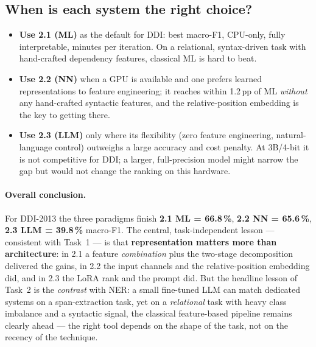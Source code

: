\documentclass[a4paper,11pt]{article}
\begin{document}
\subsection{When is each system the right choice?}
\begin{itemize}
\item \textbf{Use 2.1 (ML)} as the default for DDI: best macro-F1,
CPU-only, fully interpretable, minutes per iteration. On a relational,
syntax-driven task with hand-crafted dependency features, classical ML
is hard to beat.
\item \textbf{Use 2.2 (NN)} when a GPU is available and one prefers
learned representations to feature engineering; it reaches within 1.2\,pp
of ML \emph{without} any hand-crafted syntactic features, and the
relative-position embedding is the key to getting there.
\item \textbf{Use 2.3 (LLM)} only where its flexibility (zero feature
engineering, natural-language control) outweighs a large accuracy and
cost penalty. At 3B/4-bit it is not competitive for DDI; a larger,
full-precision model might narrow the gap but would not change the
ranking on this hardware.
\end{itemize}

\paragraph{Overall conclusion.}
For DDI-2013 the three paradigms finish \textbf{2.1 ML = 66.8\,\%},
\textbf{2.2 NN = 65.6\,\%}, \textbf{2.3 LLM = 39.8\,\%} macro-F1. The
central, task-independent lesson --- consistent with Task~1 --- is that
\textbf{representation matters more than architecture}: in 2.1 a feature
\emph{combination} plus the two-stage decomposition delivered the gains,
in 2.2 the input channels and the relative-position embedding did, and
in 2.3 the LoRA rank and the prompt did. But the headline lesson of
Task~2 is the \emph{contrast} with NER: a small fine-tuned LLM can match
dedicated systems on a span-extraction task, yet on a \emph{relational}
task with heavy class imbalance and a syntactic signal, the classical
feature-based pipeline remains clearly ahead --- the right tool depends
on the shape of the task, not on the recency of the technique.
\end{document}
